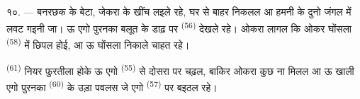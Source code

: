 १०. --- बनरछक के बेटा, जेकरा के  खींच लइले रहे,
घर से बाहर निकलल आ हमनी के दुनो जंगल में लवट गइनी जा। ऊ एगो पुरनका
बलूत के डाढ़ पर  \textsuperscript{(56)} देखले रहे। ओकरा
लागल कि ओकर घोंसला  \textsuperscript{(58)} में छिपल होई, आ
ऊ घोंसला निकाले चाहत रहे।

 \textsuperscript{(61)} नियर फुरतीला होके ऊ एगो
 \textsuperscript{(55)} से दोसरा पर चढ़ल, बाकिर ओकरा कुछ ना
मिलल आ ऊ खाली एगो पुरनका  \textsuperscript{(60)} के उड़ा
पवलस जे एगो  \textsuperscript{(57)} पर बइठल रहे।
